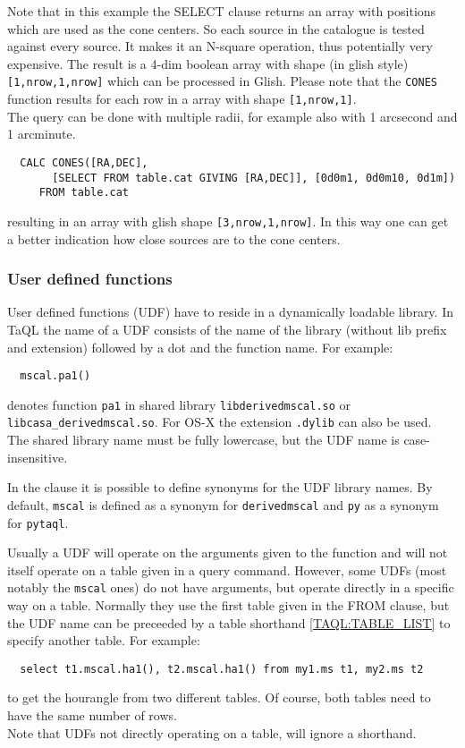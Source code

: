 Note that in this example the SELECT clause returns an array with positions
which are used as the cone centers. So each source in the catalogue is
tested against every source. It makes it an N-square operation, thus
potentially very expensive.
The result is a 4-dim boolean array with shape (in glish style)
\texttt{[1,nrow,1,nrow]} which can be processed in Glish. Please note
that the \texttt{CONES} function results for 
each row in a array with shape \texttt{[1,nrow,1]}.
\\The query can be done with multiple radii, for example also
with 1 arcsecond and 1 arcminute.
\begin{verbatim}
  CALC CONES([RA,DEC],
       [SELECT FROM table.cat GIVING [RA,DEC]], [0d0m1, 0d0m10, 0d1m])
     FROM table.cat
\end{verbatim}
resulting in an array with glish shape \texttt{[3,nrow,1,nrow]}.
In this way one can get a better indication how close sources are to
the cone centers.

\subsubsection{\label{TAQL:UDF}User defined functions}
User defined functions (UDF) have to reside in a dynamically loadable
library. In TaQL the name of a UDF consists of the name of the
library (without lib prefix and extension) followed by a dot and the function name.
For example:
\begin{verbatim}
  mscal.pa1()
\end{verbatim}
denotes function \texttt{pa1} in shared library
\texttt{libderivedmscal.so} or \texttt{libcasa\_derivedmscal.so}. For
OS-X the extension \texttt{.dylib} can also be used.
\\The shared library name must be fully lowercase, but the UDF name is
case-insensitive. 

In the  clause it is
possible to define synonyms for the UDF library names. By default,
\texttt{mscal} is defined as a synonym for \texttt{derivedmscal} and
\texttt{py} as a synonym for \texttt{pytaql}.

Usually a UDF will operate on the arguments given to the function and
will not itself operate on a table given in a query command.
However, some UDFs (most notably the \texttt{mscal} ones) do not have
arguments, but operate directly in a specific way on a table. Normally
they use the first table given in the FROM clause, but the UDF name
can be preceeded by a table shorthand \ref{TAQL:TABLE_LIST} to specify
another table. For example:
\begin{verbatim}
  select t1.mscal.ha1(), t2.mscal.ha1() from my1.ms t1, my2.ms t2
\end{verbatim}
to get the hourangle from two different tables.
Of course, both tables need to have the same number of rows.
\\Note that UDFs not directly operating on a table, will ignore a shorthand.


